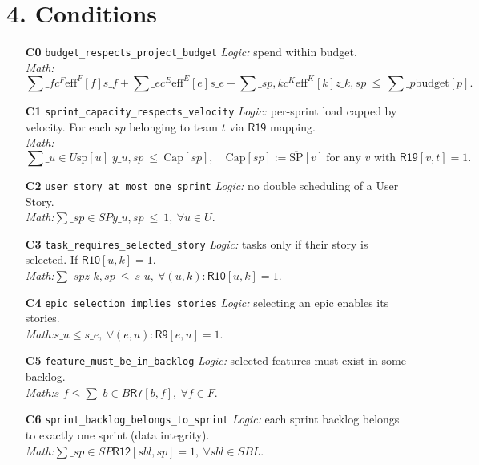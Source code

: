 \documentclass[11pt]{article}
\begin{document}
\section{4. Conditions}
\begin{itemize}[leftmargin=2em]
  \item[\textbf{C0} \texttt{budget\_respects\_project\_budget}] \emph{Logic:} spend within budget. \\
  \emph{Math:} 
  \[
  \sum\_{f} c^{F}\mathrm{eff}^{F}[f]s\_f+\sum\_{e} c^{E}\mathrm{eff}^{E}[e]s\_e+\sum\_{sp,k} c^{K}\mathrm{eff}^{K}[k]z\_{k,sp}\ \le\ \sum\_{p}\mathrm{budget}[p].
  \]

  \item[\textbf{C1} \texttt{sprint\_capacity\_respects\_velocity}] \emph{Logic:} per-sprint load capped by velocity. For each $sp$ belonging to team $t$ via $\mathsf{R19}$ mapping. \\
  \emph{Math:}
  \[
  \sum\_{u\in U}\mathrm{sp}[u]\; y\_{u,sp}\ \le\ \mathrm{Cap}[sp],\quad \mathrm{Cap}[sp]:=\overline{\mathrm{SP}}[v]\ \text{for any } v \text{ with } \mathsf{R19}[v,t]=1.
  \]

  \item[\textbf{C2} \texttt{user\_story\_at\_most\_one\_sprint}] \emph{Logic:} no double scheduling of a User Story. \\
  \emph{Math:}\quad $\sum\_{sp\in SP} y\_{u,sp}\ \le\ 1,\ \forall u\in U.$

  \item[\textbf{C3} \texttt{task\_requires\_selected\_story}] \emph{Logic:} tasks only if their story is selected. If $\mathsf{R10}[u,k]=1$. \\
  \emph{Math:}\quad $\sum\_{sp} z\_{k,sp}\ \le\ s\_u,\ \forall (u,k):\mathsf{R10}[u,k]=1.$

  \item[\textbf{C4} \texttt{epic\_selection\_implies\_stories}] \emph{Logic:} selecting an epic enables its stories. \\
  \emph{Math:}\quad $s\_u \le s\_e,\ \forall (e,u):\mathsf{R9}[e,u]=1.$

  \item[\textbf{C5} \texttt{feature\_must\_be\_in\_backlog}] \emph{Logic:} selected features must exist in some backlog. \\
  \emph{Math:}\quad $s\_f \le \sum\_{b\in B}\mathsf{R7}[b,f],\ \forall f\in F.$

  \item[\textbf{C6} \texttt{sprint\_backlog\_belongs\_to\_sprint}] \emph{Logic:} each sprint backlog belongs to exactly one sprint (data integrity). \\
  \emph{Math:}\quad $\sum\_{sp\in SP}\mathsf{R12}[sbl,sp]=1,\ \forall sbl\in SBL.$


\end{itemize}
\end{document}

